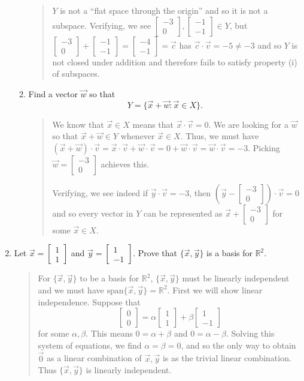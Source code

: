 \documentclass[letter]{article}
\newcommand{\R}{\mathbb{R}}
\newcommand{\Span}{\mathrm{span}}
\newcommand{\mat}[1]{\begin{bmatrix}#1\end{bmatrix}}
\begin{document}
\begin{enumerate}
\begin{enumerate}
\begin{quote}
					$Y$ is not a ``flat space through the origin'' and so it is not a subspace.  Verifying,
					we see $\mat{-3\\0},\mat{-1\\-1}\in Y$, but $\mat{-3\\0}+\mat{-1\\-1}=\mat{-4\\-1}=\vec c$
					has $\vec c\cdot \vec v=-5\neq -3$ and so $Y$ is not closed under addition and therefore
					fails to satisfy property (i) of subspaces.
					\end{quote}
				\item Find a vector $\vec w$ so that
					\[
						Y=\{\vec x+\vec w:\vec x\in X\}.
					\]
					\begin{quote}
						We know that $\vec x\in X$ means that $\vec x\cdot\vec v=0$.  We are looking
						for a $\vec w$ so that $\vec x+\vec w\in Y$ whenever $\vec x\in X$.
						Thus, we must have $(\vec x+\vec w)\cdot \vec v = \vec x\cdot \vec v+\vec w\cdot\vec v
						=0+\vec w\cdot\vec v = \vec w\cdot\vec v = -3$.  Picking $\vec w=\mat{-3\\0}$ achieves
						this.

						Verifying, we see indeed if $\vec y\cdot \vec v = -3$, then $\left(\vec y-\mat{-3\\0}\right)\cdot
						\vec v = 0$ and so every vector in $Y$ can be represented as $\vec x+\mat{-3\\0}$ for some
						$\vec x\in X$.
					\end{quote}
			\end{enumerate}
		\item Let $\vec x=\mat{1\\1}$ and $\vec y=\mat{1\\-1}$.  Prove that $\{\vec x,\vec y\}$ is a 
			basis for $\R^2$.
			\begin{quote}
				For $\{\vec x,\vec y\}$ to be a basis for $\R^2$, $\{\vec x,\vec y\}$ must be linearly
				independent and we must have $\Span\{\vec x,\vec y\}=\R^2$.  
				First we will show linear independence.  Suppose that
				\[
					\mat{0\\0} = \alpha\mat{1\\1}+\beta\mat{1\\-1}
				\]
				for some $\alpha,\beta$.  This means $0=\alpha+\beta$ and $0=\alpha-\beta$.
				Solving this system of equations, we find $\alpha=\beta=0$, and so the only
				way to obtain $\vec 0$ as a linear combination of $\vec x,\vec y$ is as
				the trivial linear combination.  Thus $\{\vec x,\vec y\}$ is linearly independent.


\end{quote}
\end{enumerate}
\end{document}
